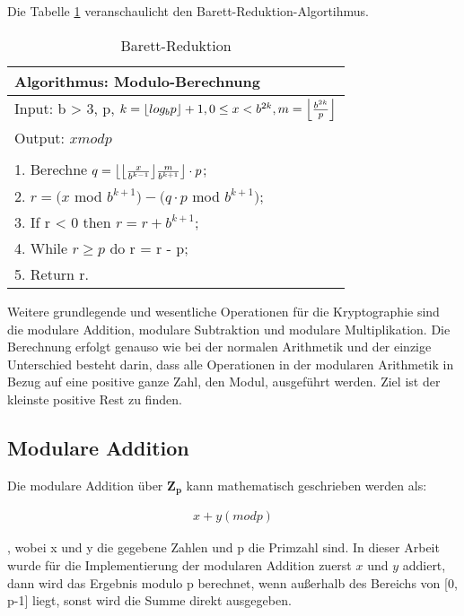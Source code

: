  Die Tabelle \ref{tab3} veranschaulicht den Barett-Reduktion-Algortihmus. 



\begin{table}[!ht]
\centering
	\begin{tabular}{l}
		\toprule
		\textbf{Algorithmus: Modulo-Berechnung}\\
		\midrule
		Input: b > 3, p, $ k = \floor*{log_bp} + 1, 0 \leq x < b^{2k}, m = \floor*{\frac{b^{2k}}{p}} $\\
		Output: $ x mod p $ \\
		                                           \\
		                                           
		1. Berechne $ q = \floor*{ \floor*{\frac{x}{b^{k-1}}} \frac{m}{b^{k+1}} }\cdot p $;\\
		2. $ r = (x $ mod $ b^{k+1} ) - (q \cdot p $ mod $ b^{k+1})$;  \\
		3. If r < 0 then $ r = r + b^{k+1}$;\\ 
		4. While $ r \geq p $ do r = r - p; \\
		5. Return r. \\
	   \bottomrule
	\end{tabular}
	\caption{Barett-Reduktion\cite{nist}}
	\label{tab3}
\end{table}




Weitere grundlegende und wesentliche Operationen für die
Kryptographie sind die modulare Addition, modulare Subtraktion und modulare Multiplikation. 
Die Berechnung erfolgt genauso wie bei der normalen Arithmetik
und der einzige Unterschied besteht darin, dass  alle
Operationen in der modularen Arithmetik in Bezug auf eine
positive ganze Zahl, den Modul, ausgeführt werden.
Ziel ist der kleinste positive Rest zu finden.

\subsection{Modulare Addition}


Die modulare Addition über $ \mathbf{Z_p} $ kann mathematisch
geschrieben werden als:

\begin{ceqn}
\begin{align*}
    x + y ( mod p ) 
\end{align*}
\end{ceqn}, wobei x und y die
gegebene Zahlen und p die Primzahl sind. In dieser Arbeit wurde für die Implementierung der modularen Addition zuerst $ x $ und $ y $ 
addiert, dann wird das Ergebnis modulo p berechnet, wenn außerhalb des Bereichs von [0, p-1] liegt, sonst wird die Summe direkt ausgegeben.

